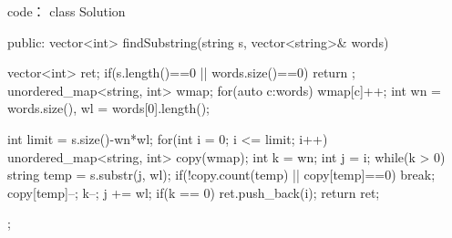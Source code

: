 code：
class Solution {
public:
    vector<int> findSubstring(string s, vector<string>& words) {
        vector<int> ret;
        if(s.length()==0 || words.size()==0) return {};
        unordered_map<string, int> wmap;
        for(auto c:words) wmap[c]++;
        int wn = words.size(), wl = words[0].length();
        
        int limit = s.size()-wn*wl;
        for(int i = 0; i <= limit; i++)
        {
            unordered_map<string, int> copy(wmap);
            int k = wn;
            int j = i;
            while(k > 0)
            {
                string temp = s.substr(j, wl);
                if(!copy.count(temp) || copy[temp]==0) break;
                copy[temp]--;
                k--;
                j += wl;
            }
            if(k == 0) ret.push_back(i);
        }
        return ret;
    }
};